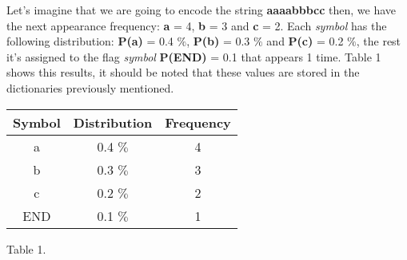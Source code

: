 Let's imagine that we are going to encode the string {\bfseries aaaabbbcc} then, we have the next appearance frequency: {\bfseries a} = 4, {\bfseries b} = 3 and {\bfseries c} = 2. Each {\itshape symbol} has the following distribution: {\bfseries P(a)} = 0.4 $\%$, {\bfseries P(b)} = 0.3 $\%$ and {\bfseries P(c)} = 0.2 $\%$, the rest it's assigned to the flag {\itshape symbol} {\bfseries P(END)} = 0.1 that appears 1 time. Table 1 shows this results, it should be noted that these values are stored in the dictionaries previously mentioned. \hfill \break

\begin{center}
\begin{tabular}{c c c}
\toprule \toprule
\hspace{50px} Symbol \hspace{50px} & \hspace{45px} Distribution \hspace{45px} & \hspace{50px} Frequency \hspace{50px} \\
\midrule \midrule
a & 0.4 $\%$ & 4 \\
\midrule
b & 0.3 $\%$ & 3 \\
\midrule 
c & 0.2 $\%$ & 2 \\
\midrule
END & 0.1 $\%$ & 1 \\
\bottomrule
\end{tabular}
\linebreak \linebreak Table 1.
\end{center}

\pagebreak
